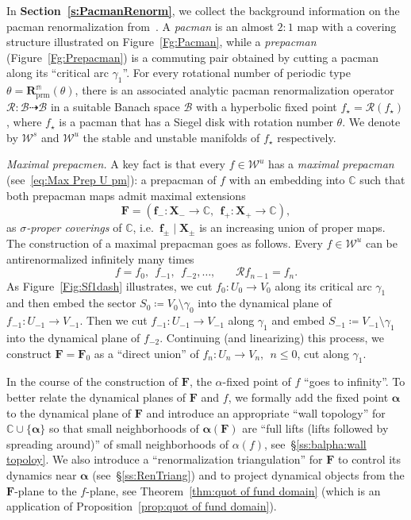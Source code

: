 \documentclass{amsart}
\renewcommand{\sp}{{\ \ }}
\newcommand{\1}{{\mathbb 1 }}
\newcommand\RR{\mathcal{R}}
\newcommand\prm{{\operatorname{prm}}}
\newcommand\mRRc{ \boldsymbol R_{\prm}}%
\newcommand{\bF}{{\mathbf F}}
\newcommand{\bX}{{\mathbf X}}
\newcommand{\bbf}{{\mathbf f}}
\newcommand{\str}{{\star}}
\newcommand{\mm}{\mathbb{m}}
\newcommand\WW{\mathcal{W}}
\newcommand\BB{\mathcal{B}}
\newcommand{\C}{\mathbb{C}}
\theoremstyle{remark}
\numberwithin{equation}{section}
\theoremstyle{definition}
\newcommand{\balpha}{{\boldsymbol \alpha}}
\theoremstyle{nonumberbreak}
\begin{document}
In {\bf Section~\ref{s:PacmanRenorm}}, we collect the background information on the pacman renormalization from~\cite{DLS}. A \emph{pacman} is an almost $2:1$ map with a covering structure illustrated on Figure~\ref{Fg:Pacman}, while a \emph{prepacman} (Figure~\ref{Fg:Prepacman}) is a commuting pair obtained by cutting a pacman along its ``critical arc $\gamma_1$''. For every rotational number of periodic type  $\theta=\mRRc^\mm(\theta)$, there is an associated analytic pacman renormalization operator $\RR\colon \BB\dashrightarrow \BB$ in a suitable Banach space $\BB$ with a hyperbolic fixed point $f_\str=\RR (f_\str)$, where $f_\str$ is a pacman that has a Siegel disk with rotation number $\theta$. We denote by $\WW^s$ and $\WW^u$ the stable and unstable manifolds of $f_\str$ respectively.


\emph{Maximal prepacmen.} A key fact is that every $f\in \WW^u$ has a \emph{maximal prepacman} (see~\eqref{eq:Max Prep U pm}): a prepacman of $f$ with an embedding into $\C$ such that both prepacman maps admit maximal extensions 
\[\bF= (\bbf_-\colon  \bX_-\to \C,\sp \bbf_+\colon  \bX_+\to \C),
\] 
as \emph{$\sigma$-proper coverings} of $\C$, i.e.~$\bbf_\pm \mid \bX_\pm$ is an increasing union of proper maps. The construction of a maximal prepacman goes as follows. Every $f\in \WW^u$ can be antirenormalized infinitely many times \[f=f_0,\sp f_{-1},\sp f_{-2},\dots,\sp \sp\sp\sp \RR f_{n-1}=f_n.\]
As Figure~\ref{Fig:Sf1dash} illustrates, we cut $f_0\colon U_0\to V_0$ along its critical arc $\gamma_1$ and then embed the sector $S_0\coloneqq V_0\setminus \gamma_0$ into the dynamical plane of $f_{-1}\colon U_{-1}\to V_{-1}$. Then we cut $f_{-1}\colon U_{-1}\to V_{-1}$ along $\gamma_1$ and embed $S_{-1}\coloneqq V_{-1}\setminus \gamma_{1}$ into the dynamical plane of $f_{-2}$. Continuing (and linearizing) this process, we construct $\bF=\bF_0$ as a ``direct union'' of $f_n\colon U_n\to V_n,\sp n\le 0$, cut along $\gamma_1$.

In the course of the construction of $\bF$, the $\alpha$-fixed point of $f$ ``goes to infinity''. To better  relate the dynamical planes of $\bF$ and $f$, we formally add the fixed point $\balpha$ to the dynamical plane of $\bF$ and introduce an appropriate ``wall topology'' for $\C\cup \{\balpha\}$ so that small neighborhoods of $\balpha(\bF)$ are ``full lifts (lifts followed by spreading around)'' of small neighborhoods of $\alpha(f)$, see~\S\ref{ss:balpha:wall topoloy}. We also introduce a ``renormalization triangulation'' for $\bF$ to control its dynamics near $\balpha$ (see~\S\ref{ss:RenTriang}) and to project dynamical objects from the $\bF$-plane to the $f$-plane, see Theorem~\ref{thm:quot of fund domain} (which is an application of Proposition~\ref{prop:quot of fund domain}).
\end{document}
